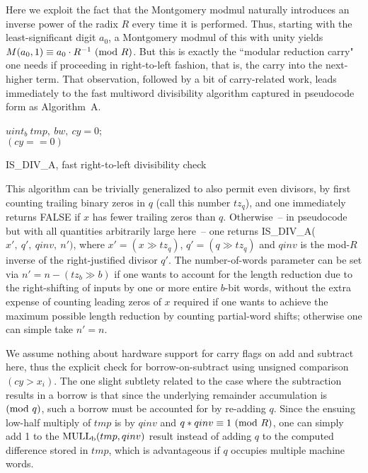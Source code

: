 \documentclass{article}
\begin{document}
Here we exploit the fact that the Montgomery modmul naturally introduces an inverse power of the radix $R$ every time it is performed. Thus, starting with the least-significant digit $a_0$, a Montgomery modmul of this with unity yields $M(a_0,1) \equiv a_0 \cdot R^{-1}\ ({\rm mod}\ R)$. But this is exactly the ``modular reduction carry" one needs if proceeding in right-to-left fashion, that is, the carry into the next-higher term. That observation, followed by a bit of carry-related work, leads immediately to the fast multiword divisibility algorithm captured in pseudocode form as Algorithm~A.

\begin{algorithm}\SetAlgoLined
{}
\vspace{0.1in}
{
	$uint_b\ tmp,\ bw,\ cy = 0$;\\
	\Return $(cy == 0)$\;
}
\caption{IS\_DIV\_A, fast right-to-left divisibility check}
\label{algo_a}
\end{algorithm}

This algorithm can be trivially generalized to also permit even divisors, by first counting trailing binary zeros in $q$ (call this number $tz_q$), and one immediately returns FALSE if $x$ has fewer trailing zeros than $q$. Otherwise~-- in pseudocode but with all quantities arbitrarily large here~-- one returns IS\_DIV\_A($x',\ q',\ qinv,\ n')$, where  $x' = (x \gg tz_q)$, $q' = (q \gg tz_q)$ and $qinv$ is the mod-$R$ inverse of the right-justified divisor $q'$. The number-of-words parameter can be set via $n' = n - (tz_b \gg b)$ if one wants to account for the length reduction due to the right-shifting of inputs by one or more entire $b$-bit words, without the extra expense of counting leading zeros of $x$ required if one wants to achieve the maximum possible length reduction by counting partial-word shifts; otherwise one can simple take $n' = n$.

We assume nothing about hardware support for carry flags on add and subtract here, thus the explicit check for borrow-on-subtract using unsigned comparison $(cy > x_i)$. The one slight subtlety related to the case where the subtraction results in a borrow is that since the underlying remainder accumulation is $({\rm mod}\ q)$, such a borrow must be accounted for by re-adding $q$. Since the ensuing low-half multiply of $tmp$ is by $qinv$ and $q*qinv \equiv 1\ ({\rm mod}\ R)$, one can simply add 1 to the ${\rm MULL_b}(tmp, qinv)$ result instead of adding $q$ to the computed difference stored in $tmp$, which is advantageous if $q$ occupies multiple machine words.
\end{document}
